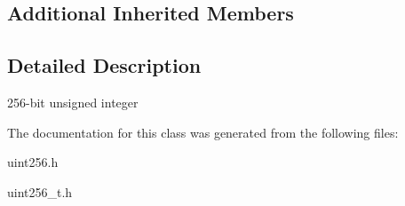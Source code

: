 \subsection*{Additional Inherited Members}


\subsection{Detailed Description}
256-\/bit unsigned integer 

The documentation for this class was generated from the following files\+:\begin{DoxyCompactItemize}
\item 
uint256.\+h\item 
uint256\+\_\+t.\+h\end{DoxyCompactItemize}
